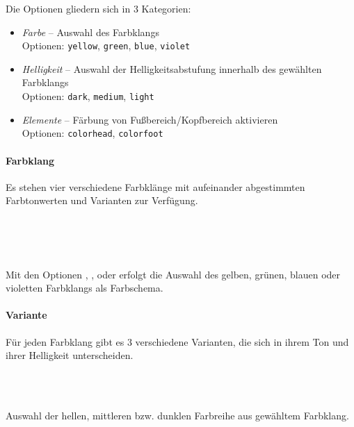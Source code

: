 Die Optionen gliedern sich in 3 Kategorien:
\begin{itemize}
  \item \emph{Farbe} -- Auswahl des Farbklangs\\
    Optionen: \texttt{yellow}, \texttt{green}, \texttt{blue}, \texttt{violet}
  \item \emph{Helligkeit} -- Auswahl der Helligkeitsabstufung
    innerhalb des gewählten Farbklangs\\
    Optionen: \texttt{dark}, \texttt{medium}, \texttt{light}
  \item \emph{Elemente} -- Färbung von Fußbereich/Kopfbereich aktivieren\\
    Optionen: \texttt{colorhead}, \texttt{colorfoot}
\end{itemize}


\paragraph{Farbklang}
Es stehen vier verschiedene Farbklänge mit aufeinander abgestimmten Farbtonwerten
und Varianten zur Verfügung.

\begin{Declaration}
  \\
  \\
  \\
\end{Declaration}

Mit den Optionen , , 
oder  erfolgt die Auswahl des
gelben, grünen, blauen oder violetten Farbklangs als Farbschema.

\paragraph{Variante}
Für jeden Farbklang gibt es 3 verschiedene Varianten, die sich in ihrem Ton
und ihrer Helligkeit unterscheiden.

\begin{Declaration}
  \\
  \\
\end{Declaration}

Auswahl der hellen, mittleren bzw. dunklen Farbreihe aus gewähltem Farbklang.

